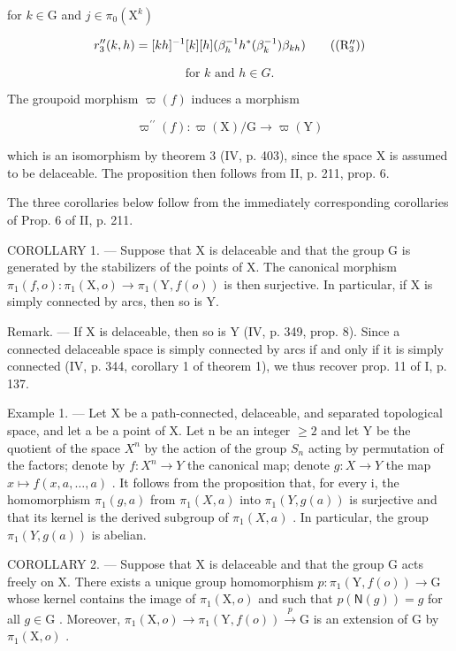 for \(k\in \mathrm{G}\) and \(j\in \pi_0(\mathrm{X}^k)\)

\[
r _ {3} ^ {\prime \prime} (k, h) = [ k h ] ^ {- 1} [ k ] [ h ] (\beta_ {h} ^ {- 1} h ^ {*} (\beta_ {k} ^ {- 1}) \beta_ {k h})\tag{\((\mathrm{R}_{3}^{\prime \prime})\)}
\]

\[
\text {for } k \text { and } h \in G.
\]

The groupoid morphism \(\varpi(f)\) induces a morphism

\[
\varpi^ {\prime \prime} (f) \colon \varpi (\mathrm{X}) / \mathrm{G} \to \varpi (\mathrm{Y})
\]

which is an isomorphism by theorem 3 (IV, p. 403), since the space X is assumed to be delaceable. The proposition then follows from II, p. 211, prop. 6.

The three corollaries below follow from the immediately corresponding corollaries of Prop. 6 of II, p. 211.

COROLLARY 1. --- Suppose that X is delaceable and that the group G is generated by the stabilizers of the points of X. The canonical morphism \(\pi_{1}(f,o)\colon\pi_{1}(\mathrm{X},o)\to\pi_{1}(\mathrm{Y},f(o))\) is then surjective. In particular, if X is simply connected by arcs, then so is Y.

Remark. --- If X is delaceable, then so is Y (IV, p. 349, prop. 8). Since a connected delaceable space is simply connected by arcs if and only if it is simply connected (IV, p. 344, corollary 1 of theorem 1), we thus recover prop. 11 of I, p. 137.

Example 1. --- Let X be a path-connected, delaceable, and separated topological space, and let a be a point of X. Let n be an integer \(\geqslant 2\) and let Y be the quotient of the space \(X^{n}\) by the action of the group \(S_{n}\) acting by permutation of the factors; denote by \(f: X^{n} \to Y\) the canonical map; denote \(g: X \to Y\) the map \(x \mapsto f(x, a, \ldots, a)\) . It follows from the proposition that, for every i, the homomorphism \(\pi_{1}(g, a)\) from \(\pi_{1}(X, a)\) into \(\pi_{1}(Y, g(a))\) is surjective and that its kernel is the derived subgroup of \(\pi_{1}(X, a)\) . In particular, the group \(\pi_{1}(Y, g(a))\) is abelian.

COROLLARY 2. --- Suppose that X is delaceable and that the group G acts freely on X. There exists a unique group homomorphism \(p \colon \pi_1(\mathrm{Y}, f(o)) \to \mathrm{G}\) whose kernel contains the image of \(\pi_1(\mathrm{X}, o)\) and such that \(p(\mathsf{N}(g)) = g\) for all \(g \in \mathrm{G}\) . Moreover, \(\pi_1(\mathrm{X}, o) \to \pi_1(\mathrm{Y}, f(o)) \xrightarrow{p} \mathrm{G}\) is an extension of G by \(\pi_1(\mathrm{X}, o)\) .

